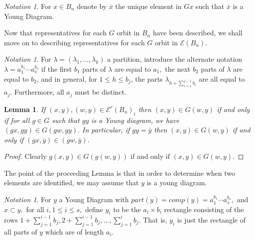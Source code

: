 \documentclass[10 pt]{amsart}
\theoremstyle{plain}
\newtheorem{lem}[thm]{Lemma}
\theoremstyle{definition}
\theoremstyle{remark}
\newtheorem{note}[thm]{Notation}
\numberwithin{equation}{section}
\begin{document}
\begin{note}
For $x \in B_n$ denote by $\overline{x}$ the unique element in $Gx$ such that $\overline{x}$ is a Young Diagram.
\end{note}

Now that representatives for each $G$ orbit in $B_n$ have been described, we shall move on to describing representatives for each $G$ orbit in $\mathcal E(B_n).$

\begin{note}
For $\lambda = (\lambda_1,\ldots, \lambda_k)$ a partition, introduce the alternate notation $\lambda = a_1^{b_1} \cdots a_s^{b_s}$ if the first $b_1$ parts of $\lambda$ are equal to $a_1,$ the next $b_2$ parts of $\lambda$ are equal to $b_2$, and in general, for $1 \leq h\leq b_j$, the parts $ \lambda_{h+\sum_{i=1}^{j-1} b_i}$ are all equal to $a_j.$ Furthermore, all $a_j$ must be distinct.
\end{note}

\begin{lem}
\label{lem:young_diag_reduction}
If $(x, y), (w, y) \in\mathcal E^r(B_n)_i$ then $(x, y) \in G(w, y)$ if and only if for all $g \in G$ such that $gy$ is a Young diagram, we have $(gx, gy) \in G(gw, gy).$ In particular, if $gy = \overline y$ then $(x, y) \in G(w, y)$ if and only if $(gx, \overline y) \in (gw, \overline y).$
\end{lem}
\begin{proof}
Clearly $g(x, y) \in G(g(w, y))$ if and only if $(x, y) \in G(w, y).$
\end{proof}

The point of the proceeding Lemma is that in order to determine when two elements are identified, we may assume that $y$ is a young diagram.

\begin{note}
For $y$ a Young Diagram with $part(y) = comp(y) = a_1^{b_1}\cdots a_s^{b_s},$ and $x \subset y,$ for all $i,1 \leq i \leq s,$ define $y_i$ to be the $a_i \times b_i$ rectangle consisting of the rows $1+\sum_{j = 1}^{i-1} b_j,2+\sum_{j = 1}^{i-1} b_j,\ldots, \sum_{j = 1}^{i} b_j.$ That is, $y_i$ is just the rectangle of all parts of $y$ which are of length $a_i.$
\end{note}
\end{document}
